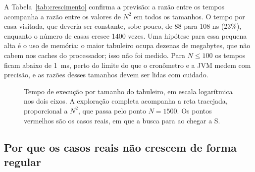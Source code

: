 A Tabela~\ref{tab:crescimento} confirma a previsão: a razão entre os tempos acompanha a razão
entre os valores de $N^2$ em todos os tamanhos. O tempo por casa visitada, que deveria ser
constante, sobe pouco, de 88 para 108 ns (23\%), enquanto o número de casas cresce 1400 vezes.
Uma hipótese para essa pequena alta é o uso de memória: o maior tabuleiro ocupa dezenas de
megabytes, que não cabem nos caches do processador; isso não foi medido. Para $N \le 100$ os
tempos ficam abaixo de 1~ms, perto do limite do que o cronômetro e a JVM medem com precisão, e
as razões desses tamanhos devem ser lidas com cuidado.

\begin{figure}[ht]
  \centering
  \caption{Tempo de execução por tamanho do tabuleiro, em escala logarítmica nos dois eixos. A
  exploração completa acompanha a reta tracejada, proporcional a $N^2$, que passa pelo ponto
  $N = 1500$. Os pontos vermelhos são os casos reais, em que a busca para ao chegar a S.}
  \label{fig:crescimento}
\end{figure}

\subsection{Por que os casos reais não crescem de forma regular}
\label{sec:casos-reais}

